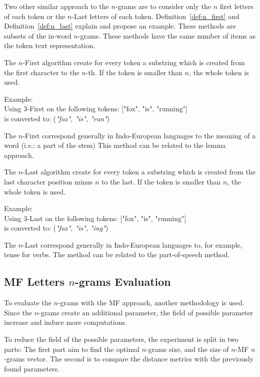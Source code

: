 Two other similar approach to the $n$-grams are to consider only the $n$ first letters of each token or the $n$-Last letters of each token.
Definition~\ref{def:n_first} and Definition~\ref{def:n_last} explain and propose an example.
These methods are subsets of the in-word $n$-grams.
These methods have the same number of items as the token text representation.

\begin{definition}
  The $n$-First algorithm create for every token a substring which is created from the first character to the $n$-th.
  If the token is smaller than $n$, the whole token is used.

  Example: \\
  Using $3$-First on the following tokens: ["fox", "is", "running"] \\
  is converted to: (\textit{"fox", "is", "run"})
\end{definition}

The $n$-First correspond generally in Indo-European languages to the meaning of a word (i.e.: a part of the stem)
This method can be related to the lemma approach.

\begin{definition}[$n$-Last]
  \label{def:n_last}
  The $n$-Last algorithm create for every token a substring which is created from the last character position minus $n$ to the last.
  If the token is smaller than $n$, the whole token is used.

  Example: \\
  Using $3$-Last on the following tokens: ["fox", "is", "running"] \\
  is converted to: (\textit{"fox", "is", "ing"})
\end{definition}

The $n$-Last correspond generally in Indo-European languages to, for example, tense for verbs.
The method can be related to the part-of-speech method.

\subsection{MF Letters $n$-grams Evaluation}

To evaluate the $n$-grams with the MF approach, another methodology is used.
Since the $n$-grams create an additional parameter, the field of possible parameter increase and induce more computations.

To reduce the field of the possible parameters, the experiment is split in two parts:
The first part aim to find the optimal $n$-grams size, and the size of $n$-MF $n$-grams vector.
The second is to compare the distance metrics with the previously found parameters.

